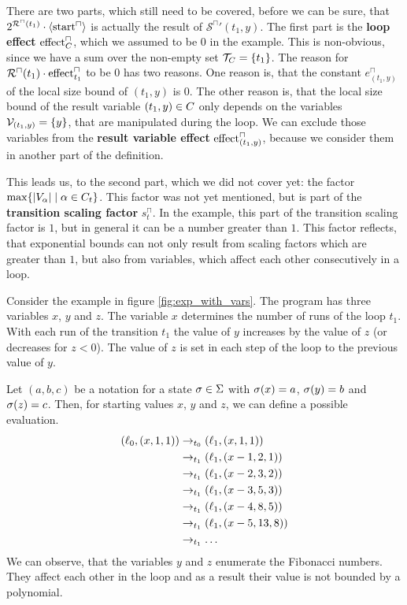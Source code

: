 There are two parts, which still need to be covered, before we can be sure, that $2^{{\mathcal{R}^\sqcap}(t_1)} \cdot \langle\text{start}^\sqcap\rangle$ is actually the result of ${\mathcal{S}^\sqcap}'(t_1,y)$.
The first part is the \textbf{loop effect} $\text{effect}^\sqcap_C$, which we assumed to be $0$ in the example.
This is non-obvious, since we have a sum over the non-empty set $\mathcal{T}_C = \lbrace t_1 \rbrace$.
The reason for ${\mathcal{R}^\sqcap}(t_1) \cdot \text{effect}^\sqcap_{t_1}$ to be $0$ has two reasons.
One reason is, that the constant $e^\sqcap_{(t_1,y)}$ of the local size bound of $(t_1,y)$ is $0$.
The other reason is, that the local size bound of the result variable $(t_1,y) \in C$ only depends on the variables $\mathcal{V}_{(t_1,y)} = \lbrace y \rbrace$, that are manipulated during the loop.
We can exclude those variables from the \textbf{result variable effect} $\text{effect}^\sqcap_{(t_1,y)}$, because we consider them in another part of the definition.

This leads us, to the second part, which we did not cover yet: the factor $\max \lbrace \left|V_\alpha\right| \mid \alpha \in C_t \rbrace$.
This factor was not yet mentioned, but is part of the \textbf{transition scaling factor} $s^\sqcap_t$.
In the example, this part of the transition scaling factor is $1$, but in general it can be a number greater than $1$.
This factor reflects, that exponential bounds can not only result from scaling factors which are greater than $1$, but also from variables, which affect each other consecutively in a loop.



Consider the example in figure \ref{fig:exp_with_vars}.
The program has three variables $x$, $y$ and $z$.
The variable $x$ determines the number of runs of the loop $t_1$.
With each run of the transition $t_1$ the value of $y$ increases by the value of $z$ (or decreases for $z < 0$).
The value of $z$ is set in each step of the loop to the previous value of $y$.

Let $(a,b,c)$ be a notation for a state $\sigma \in \Sigma$ with $\sigma(x) = a$, $\sigma(y) = b$ and $\sigma(z) = c$.
Then, for starting values $x$, $y$ and $z$, we can define a possible evaluation.
\begin{align*}
  (\ell_0, (x,1,1)) & \rightarrow_{t_0} (\ell_1, (x,1,1)) \\
  & \rightarrow_{t_1} (\ell_1, (x-1,2,1)) \\
  & \rightarrow_{t_1} (\ell_1, (x-2,3,2)) \\
  & \rightarrow_{t_1} (\ell_1, (x-3,5,3)) \\
  & \rightarrow_{t_1} (\ell_1, (x-4,8,5)) \\
  & \rightarrow_{t_1} (\ell_1, (x-5,13,8)) \\
  & \rightarrow_{t_1} \dots
\end{align*}
We can observe, that the variables $y$ and $z$ enumerate the Fibonacci numbers.
They affect each other in the loop and as a result their value is not bounded by a polynomial.

